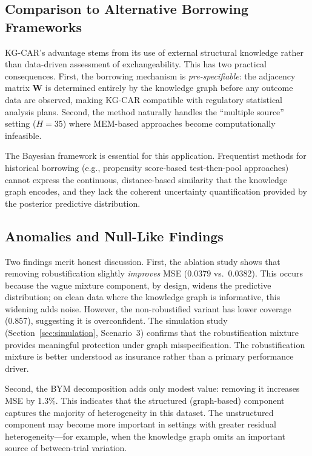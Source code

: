 \documentclass[12pt]{article}
\newcommand{\bW}{\mathbf{W}}
\begin{document}
\subsection{Comparison to Alternative Borrowing Frameworks}
\label{sec:disc_comparison}

KG-CAR's advantage stems from its use of external structural knowledge rather than data-driven assessment of exchangeability. This has two practical consequences. First, the borrowing mechanism is \emph{pre-specifiable}: the adjacency matrix $\bW$ is determined entirely by the knowledge graph before any outcome data are observed, making KG-CAR compatible with regulatory statistical analysis plans. Second, the method naturally handles the ``multiple source'' setting ($H = 35$) where MEM-based approaches \citep{kaizer2018bayesian} become computationally infeasible.

The Bayesian framework is essential for this application. Frequentist methods for historical borrowing (e.g., propensity score-based test-then-pool approaches) cannot express the continuous, distance-based similarity that the knowledge graph encodes, and they lack the coherent uncertainty quantification provided by the posterior predictive distribution.

\subsection{Anomalies and Null-Like Findings}
\label{sec:disc_anomalies}

Two findings merit honest discussion. First, the ablation study shows that removing robustification slightly \emph{improves} MSE (0.0379 vs.\ 0.0382). This occurs because the vague mixture component, by design, widens the predictive distribution; on clean data where the knowledge graph is informative, this widening adds noise. However, the non-robustified variant has lower coverage (0.857), suggesting it is overconfident. The simulation study (Section~\ref{sec:simulation}, Scenario~3) confirms that the robustification mixture provides meaningful protection under graph misspecification. The robustification mixture is better understood as insurance rather than a primary performance driver.

Second, the BYM decomposition adds only modest value: removing it increases MSE by 1.3\%. This indicates that the structured (graph-based) component captures the majority of heterogeneity in this dataset. The unstructured component may become more important in settings with greater residual heterogeneity---for example, when the knowledge graph omits an important source of between-trial variation.
\end{document}
